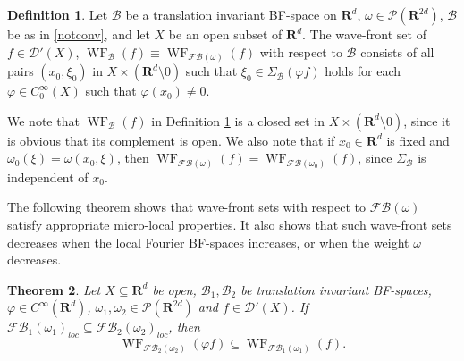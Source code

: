 \documentclass[12pt,a4paper,reqno]{amsart}
\numberwithin{equation}{section}
\newtheorem{thm}{Theorem}
\numberwithin{thm}{section}
\theoremstyle{definition}
\newtheorem{defn}[thm]{Definition}
\theoremstyle{remark}
\begin{document}
\begin{defn}\label{wave-frontdef}
Let  $\mathscr B$ be a translation invariant BF-space on ${\mathbf R^{d}}$, $\omega \in \mathscr P({\mathbf R^{{2d}}})$, $\mathcal
B$ be as in \eqref{notconv}, and let
$X$ be an open subset of ${\mathbf R^{d}}$.
The wave-front set of
$f\in \mathscr D'(X)$,
$
{\operatorname{WF}} _{\mathcal B}(f)  \equiv  {\operatorname{WF}} _{{\mathscr F\! \mathscr B}(\omega )}(f)
$
with respect to $\mathcal B$ consists of all pairs $(x_0,\xi_0)$ in
$X\times ({\mathbf R^{d}} {\setminus 0})$ such that
$
\xi _0 \in  \Sigma _{\mathcal B} ({\varphi} f)
$
holds for each ${\varphi} \in C_0^\infty (X)$ such that ${\varphi} (x_0)\neq
0$.
\end{defn}

\par

We note that ${\operatorname{WF}}  _{\mathcal B}(f)$ in Definition \ref{wave-frontdef}
is a closed set in $X\times
({\mathbf R^{d}}{\setminus 0})$, since it is obvious that its complement is
open. We also note that if $ x_0\in {\mathbf R^{d}}$ is fixed and $\omega _0(\xi
)=\omega (x_0,\xi )$, then ${\operatorname{WF}} _{{\mathscr F\! \mathscr B}(\omega )} (f)={\operatorname{WF}} _{{\mathscr F\! \mathscr B}(\omega _0)}(f)$, since $\Sigma _{\mathcal B}$ is independent of $x_0$.

\par

The following theorem shows that wave-front sets with respect to
${\mathscr F\! \mathscr B}(\omega )$ satisfy appropriate micro-local
properties. It also shows that such wave-front sets decreases when the local Fourier BF-spaces increases, or when the weight $\omega$ decreases.

\par

\begin{thm}\label{theta-sigma-propertiesAA}
Let $X\subseteq {\mathbf R^{d}}$ be open, $\mathscr B_1,\mathscr B_2$ be translation invariant BF-spaces, ${\varphi} \in C^\infty({\mathbf R^{{d}}})$, $\omega _1,\omega _2\in
\mathscr{P}({\mathbf R^{{2d}}})$ and $f\in \mathscr{D}'(X)$. If ${\mathscr F\! \mathscr B} _1(\omega _1)_{loc}\subseteq {\mathscr F\! \mathscr B} _2(\omega _2)_{loc}$, then
\begin{equation*}
{\operatorname{WF}} _{{\mathscr F\! \mathscr B} _2(\omega _2)}(\varphi f)\subseteq {\operatorname{WF}} _{{\mathscr F\! \mathscr B} _1(\omega
_1)}(f).
\end{equation*}
\end{thm}
\end{document}
